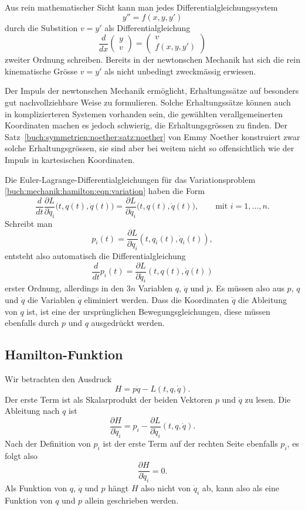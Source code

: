 Aus rein mathematischer Sicht kann man jedes Differentialgleichungssystem
\[
y'' = f(x,y,y')
\]
durch die Substition $v=y'$ als Differentialgleichung
\[
\frac{d}{dx}
\begin{pmatrix}
y\\ v
\end{pmatrix}
=
\begin{pmatrix}
v\\
f(x,y,y')
\end{pmatrix}
\]
zweiter Ordnung schreiben.
Bereits in der newtonschen Mechanik hat sich die rein kinematische
Grösse $v=y'$ als nicht unbedingt zweckmässig erwiesen.

Der Impuls der newtonschen Mechanik ermöglicht, Erhaltungssätze auf besonders
gut nachvollziehbare Weise zu formulieren.
Solche Erhaltungssätze können auch in komplizierteren Systemen
vorhanden sein, die gewählten verallgemeinerten Koordinaten machen
es jedoch schwierig, die Erhaltungsgrössen zu finden.
Der Satz~\ref{buch:symmetrien:noether:satz:noether} von Emmy Noether
konstruiert zwar solche Erhaltungsgrössen, sie sind aber bei weitem nicht
so offensichtlich wie der Impuls in kartesischen Koordinaten.

Die Euler-Lagrange-Differentialgleichungen für das Variationsproblem
\eqref{buch:mechanik:hamilton:eqn:variation} haben die Form
\[
\frac{d}{dt}
\frac{\partial L}{\partial \dot{q}_i}\bigl(t,q(t),\dot{q}(t)\bigr)
=
\frac{\partial L}{\partial q_i}\bigl(t,q(t),\dot{q}(t)\bigr),\qquad
\text{mit $i=1,\dots,n$}.
\]
Schreibt man
\[
p_i(t)
= 
\frac{\partial L}{\partial \dot{q}_i}(t,q_i(t),\dot{q}_i(t)),
\]
entsteht also automatisch die Differentialgleichung
\[
\frac{d}{dt} p_i(t)
=
\frac{\partial L}{\partial \dot{q}_i}(t,q(t),\dot{q}(t))
\]
erster
Ordnung, allerdings in den $3n$ Variablen $q$, $\dot{q}$ und
$\dot{p}$.
Es müssen also aus $p$, $q$ und $\dot{q}$ die Variablen $\dot{q}$
eliminiert werden.
Dass die Koordinaten $\dot{q}$ die Ableitung von $q$ ist, ist eine
der ursprünglichen Bewegungsgleichungen, diese müssen ebenfalls durch
$p$ und $q$ ausgedrückt werden.

%
%
\subsection{Hamilton-Funktion}
Wir betrachten den Ausdruck
\[
H
=
p\dot{q}
-
L(t,q,\dot{q}).
\]
Der erste Term ist als Skalarprodukt der beiden Vektoren $p$ und $\dot{q}$
zu lesen.
Die Ableitung nach $q$ ist
\[
\frac{\partial H}{\partial \dot{q}_i}
=
p_i
-
\frac{\partial L}{\partial \dot{q}_i}(t,q,\dot{q}).
\]
Nach der Definition von $p_i$ ist der erste Term auf der rechten Seite
ebenfalls $p_i$, es folgt also
\[
\frac{\partial H}{\partial \dot{q}_i} = 0.
\]
Als Funktion von $q$, $\dot{q}$ und $p$ hängt $H$ also nicht von $\dot{q}_i$
ab, kann also als eine Funktion von $q$ und $p$ allein geschrieben werden.

